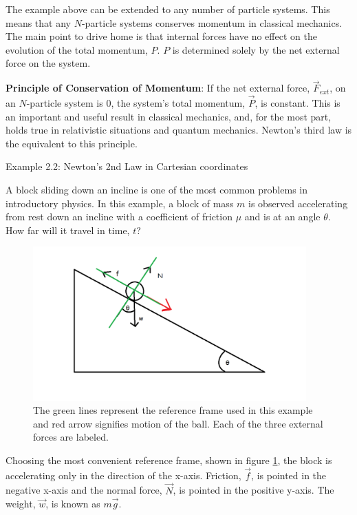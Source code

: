 {\exend }

The example above can be extended to any number of particle systems. This means that any $N$-particle systems conserves momentum in classical mechanics. The main point to drive home is that internal forces have no effect on the evolution of the total momentum, $P$. $P$ is determined solely by the net external force on the system.

{\bfseries Principle of Conservation of Momentum}: If the net external force, $\vec{F}_{ext}$, on an $N$-particle system is 0, the system's total momentum, $\vec{P}$, is constant. This is an important and useful result in classical mechanics, and, for the most part, holds true in relativistic situations and quantum mechanics. Newton's third law is the equivalent to this principle. 

{\exbegin Example 2.2: Newton's 2nd Law in Cartesian coordinates}

A block sliding down an incline is one of the most common problems in introductory physics. In this example, a block of mass $m$ is observed accelerating from rest down an incline with a coefficient of friction $\mu$ and is at an angle $\theta$. How far will it travel in time, $t$?

\begin{figure}
    \centering
    \includegraphics[width=10.5cm]{Classical_Mechanics/2.2-Newton/ball-on-incline.png}
    \caption{The green lines represent the reference frame used in this example and red arrow signifies motion of the ball. Each of the three external forces are labeled.}
    \label{fig:ball-on-incline}
\end{figure}

Choosing the most convenient reference frame, shown in figure \ref{fig:ball-on-incline}, the block is accelerating only in the direction of the x-axis. Friction, $\vec{f}$, is pointed in the negative x-axis and the normal force, $\vec{N}$, is pointed in the positive y-axis. The weight, $\vec{w}$, is known as $m\vec{g}$. 

